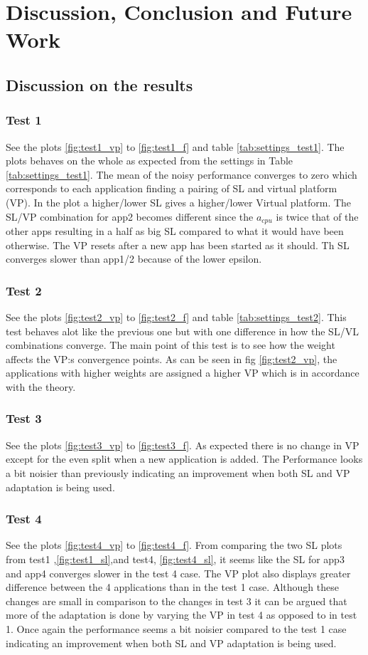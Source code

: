 \documentclass[nobiblatex]{LTHthesis}
\begin{document}
\chapter{Discussion, Conclusion and Future Work}

\section{Discussion on the results}
\subsection{Test 1}
See the plots \ref{fig:test1_vp} to \ref{fig:test1_f} and table \ref{tab:settings_test1}.
The plots behaves on the whole as expected from the settings in Table \ref{tab:settings_test1}.
The mean of the noisy performance converges to zero which corresponds to each application finding a pairing of SL and virtual platform (VP). In the plot a higher/lower SL gives a higher/lower Virtual platform. The SL/VP combination
for app2 becomes different since the $a_{cpu}$ is twice that of the other apps resulting in a half as big SL compared to what it would have been otherwise. The VP resets after a new app has been started as it should. Th SL converges slower than app1/2 because of the lower epsilon.

\subsection{Test 2} 
See the plots \ref{fig:test2_vp} to \ref{fig:test2_f} and table \ref{tab:settings_test2}.
This test behaves alot like the previous one but with one difference in how the SL/VL combinations converge. The main point of this test is to see how the weight affects the VP:s convergence points.
As can be seen in fig \ref{fig:test2_vp}, the applications with higher weights are assigned a higher VP which is in accordance with the theory.

\subsection{Test 3}
See the plots \ref{fig:test3_vp} to \ref{fig:test3_f}.
As expected there is no change in VP except for the even split when a new application is added. The Performance looks a bit noisier than previously indicating an improvement when both SL and VP adaptation is being used.

\subsection{Test 4}
See the plots \ref{fig:test4_vp} to \ref{fig:test4_f}.
From comparing the two SL plots from test1 ,\ref{fig:test1_sl},and test4, \ref{fig:test4_sl}, it seems like the SL for app3 and app4 converges slower in the test 4 case. 
The VP plot also displays greater difference between the 4 applications than in the test 1 case. Although these changes are small in comparison to the changes in test 3 it can be argued that more of the adaptation is done by varying the VP in test 4 as opposed to in test 1.
Once again the performance seems a bit noisier compared to the test 1 case indicating an improvement when both SL and VP adaptation is being used.
\end{document}
